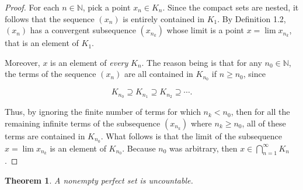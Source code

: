 \documentclass{article}
\newtheorem{theorem}{Theorem}[section]
\theoremstyle{definition}
\theoremstyle{remark}
\theoremstyle{definition}
\begin{document}
\begin{proof}
    For each $n\in\mathbb{N}$, pick a point $x_n\in K_n$. Since the compact sets are nested, it follows that the sequence $(x_n)$ is entirely contained in $K_1$. By Definition 1.2, $(x_n)$ has a convergent subsequence $(x_{n_k})$ whose limit is a point $x=\lim x_{n_k}$, that is an element of $K_1$.\par Moreover, $x$ is an element of \textit{every} $K_n$. The reason being is that for any $n_0\in\mathbb{N}$, the terms of the sequence $(x_n)$ are all contained in $K_{n_0}$ if $n\geq n_0$, since 
        
    \begin{equation*}
        K_{n_0}\supseteq K_{n_1}\supseteq K_{n_2} \supseteq\cdots.
    \end{equation*}
        
    \noindent Thus, by ignoring the finite number of terms for which $n_k<n_0$, then for all the remaining infinite terms of the subsequence $(x_{n_k})$ where $n_k\geq n_0$, all of these terms are contained in $K_{n_0}$. What follows is that the limit of the subsequence $x=\lim x_{n_k}$ is an element of $K_{n_0}$. Because $n_0$ was arbitrary, then $x\in\bigcap_{n=1}^{\infty} K_n$.  
\end{proof}
    
\begin{theorem}
    A nonempty perfect set is uncountable.
\end{theorem}
    
\end{document}
